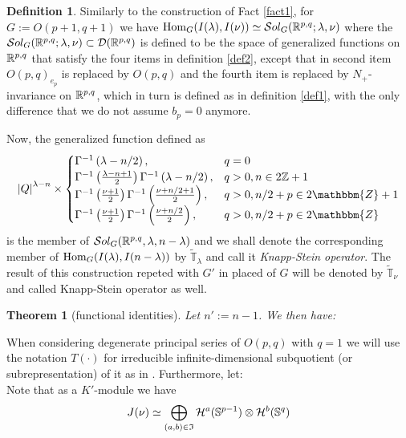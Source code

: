 \documentclass[10pt]{article} %
\newtheorem{theorem}{Theorem}
\newcommand{\Hom}{\mbox{\normalfont Hom}}
\newcommand{\Sol}{\mathcal{S}ol}
\theoremstyle{definition}
\newtheorem{definition}{Definition}
\begin{document}
	\begin{definition}
		Similarly to the construction of Fact \ref{fact1}, for $G:=O(p+1,q+1)$ we have $\Hom_G(I(\lambda),I(\nu))\simeq\Sol_G(\R^{p,q};\lambda,\nu)$
		where the $\Sol_G(\R^{p,q};\lambda,\nu)\subset\mathcal{D}(\R^{p,q})$ is defined to be the space of generalized functions on $\mathbb{R}^{p,q}$ that satisfy
		the four items in definition \ref{def2}, except that in second item $O(p,q)_{e_p}$ is replaced by $O(p,q)$ and the fourth item is replaced by $N_+$-invariance
		on $\mathbb{R}^{p,q}$, which in turn is defined as in definition \ref{def1}, with the only difference that we do not assume $b_p=0$ anymore.

		Now, the generalized function defined as
		\begin{equation*}
			\myabs{Q}^{\lambda-n}\times\begin{cases}
				\Gamma^{-1}\left( \lambda-n/2 \right),&q=0\\
				\Gamma^{-1}\left( \frac{\lambda-n+1}{2} \right)\Gamma^{-1}\left( \lambda-n/2 \right),&q>0,n\in2\Z+1\\
  \Gamma^{-1} \left( \frac{\nu + 1}{2} \right) \Gamma ^{-1}\left( \frac{\nu + n / 2 +
  1}{2} \right), &q>0, n / 2 + p \in 2\mathbbm{Z}+ 1\\
  \Gamma^{-1} \left( \frac{\nu + 1}{2} \right) \Gamma ^{-1}\left( \frac{\nu + n / 2}{2}
  \right), & q>0,n / 2 + p \in 2\mathbbm{Z}
			\end{cases}
		\end{equation*}
		is the member of $\Sol_G(\R^{p,q},\lambda,n-\lambda)$ and we shall denote the corresponding member of $\Hom_{G}(I(\lambda),I(n-\lambda))$ by $\tilde{\mathbb{T}}_{\lambda}$
		and call it \textit{Knapp-Stein operator}.
		The result of this construction repeted with $G'$ in placed of $G$ will be denoted by $\tilde{\mathbb{T}}_\nu$ and called Knapp-Stein operator as well.
	\end{definition}
	\begin{theorem}[functional identities]
		Let $n':=n-1$. We then have:
	\end{theorem}
	When considering degenerate principal series of $O(p,q)$ with $q=1$ we will use the notation $T(\cdot)$ for irreducible infinite-dimensional subquotient (or subrepresentation) of it
	as in \cite[p.19]{kobayashi2015symmetry}.
	Furthermore, let:\\
Note that as a $K'$-module we have
\[J(\nu)\simeq\bigoplus_{(a,b)\in\mathfrak{I}}\mathcal{H}^a(\mathbb{S}^{p-1})\otimes \mathcal{H}^{b}(\mathbb{S}^q)\]
\end{document}
